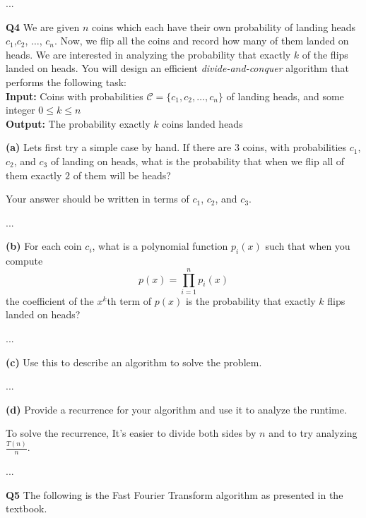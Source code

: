 \documentclass[12pt]{article}
\newcommand{\question}[3][Q]{
\begin{description}
\item \textbf{#1{#2}} #3
\end{description}
}
\newcommand{\hint}[1]{{\footnotesize
    \begin{description}
    [leftmargin=3.3em,style=nextline]
        \item[Hint:] {#1}
    \end{description}}   
}
\newcommand{\note}[1]{{\footnotesize
    \begin{description}
    [leftmargin=3.4em,style=nextline]
        \item[Note:] {#1}
    \end{description}}   
}
\begin{document}
\begin{answer}
    ...
\end{answer}

\newpage
\question{4}{
    We are given $n$ coins which each have their own probability of landing heads $c_1$,$c_2$, $\dots$, $c_n$. Now, we flip all the coins and record how many of them landed on heads. We are interested in analyzing the probability that exactly $k$ of the flips landed on heads. 
    You will design an efficient \textit{divide-and-conquer} algorithm that performs the following task:\\
    
    \textbf{Input:} Coins with probabilities $\mathcal{C} = \{c_1, c_2, \dots, c_n\}$ of landing heads, and some integer $0 \le k \le n$\\
    \textbf{Output:} The probability exactly $k$ coins landed heads
}

\question[]{(a)}{
    Lets first try a simple case by hand. If there are 3 coins, with probabilities $c_1$, $c_2$, and $c_3$ of landing on heads, what is the probability that when we flip all of them exactly $2$ of them will be heads?
    \note{Your answer should be written in terms of $c_1$, $c_2$, and $c_3$.}
}
\begin{answer}
    ...
\end{answer}

\question[]{(b)}{
    For each coin $c_i$, what is a polynomial function $p_i(x)$ such that when you compute $$p(x) = \prod_{i=1}^n p_i(x)$$
    the coefficient of the $x^k$th term of $p(x)$ is the probability that exactly $k$ flips landed on heads?
}
\begin{answer}
    ...
\end{answer}

\question[]{(c)}{
    Use this to describe an algorithm to solve the problem. 
}
\begin{answer}
    ...
\end{answer}

\question[]{(d)}{
    Provide a recurrence for your algorithm and use it to analyze the runtime.

    \hint{To solve the recurrence, It's easier to divide both sides by $n$ and to try analyzing $\frac{T(n)}{n}$.}
}
\begin{answer}
    ...
\end{answer}



\newpage
\question{5}{
    The following is the Fast Fourier Transform algorithm as presented in the textbook. 
}
\end{document}
